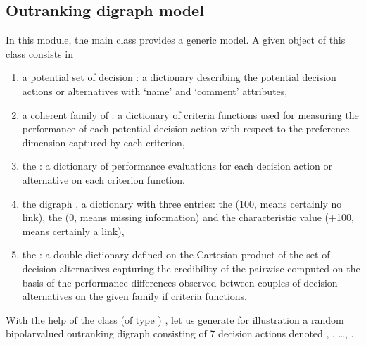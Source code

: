 \documentclass[a4paper,12pt,english]{sphinxhowto}
\begin{document}
\subsection{Outranking digraph model}
\label{\detokenize{tutorial:outranking-digraph-model}}
In this  module, the main  class provides a generic  model. A given object of this class consists in
\begin{enumerate}
%
\item {} 
a potential set of decision  : a dictionary describing the potential decision actions or alternatives with ‘name’ and ‘comment’ attributes,

\item {} 
a coherent family of : a dictionary of criteria functions used for measuring the performance of each potential decision action with respect to the preference dimension captured by each criterion,

\item {} 
the : a dictionary of performance evaluations for each decision action or alternative on each criterion function.

\item {} 
the digraph , a dictionary with three entries: the  (\sphinxhyphen{}100, means certainly no link), the  (0, means missing information) and the  characteristic value (+100, means certainly a link),

\item {} 
the  : a double dictionary defined on the Cartesian product of the set of decision alternatives capturing the credibility of the pairwise  computed on the basis of the performance differences observed between couples of decision alternatives on the given family if criteria functions.

\end{enumerate}

With the help of the  class (of type ) , let us generate for illustration a random bipolar\sphinxhyphen{}valued outranking digraph consisting of 7 decision actions denoted , , …, .
\end{document}
